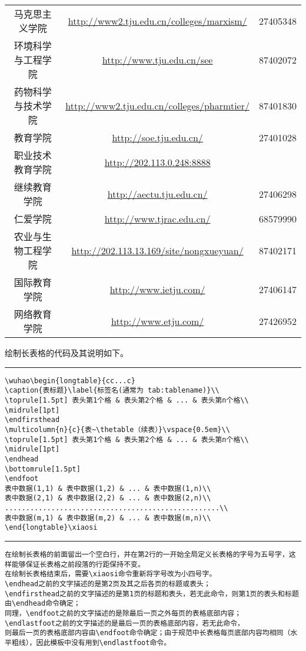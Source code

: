 \begin{longtable}{ccc}
马克思主义学院& \url{http://www2.tju.edu.cn/colleges/marxism/}& 27405348\\
环境科学与工程学院& \url{http://www.tju.edu.cn/see}& 87402072\\
药物科学与技术学院& \url{http://www2.tju.edu.cn/colleges/pharmtier/}& 87401830\\
教育学院& \url{http://soe.tju.edu.cn/}& 27401028\\
职业技术教育学院& \url{http://202.113.0.248:8888}\\
继续教育学院& \url{http://aectu.tju.edu.cn/}& 27406298\\
仁爱学院& \url{http://www.tjrac.edu.cn/}& 68579990\\
农业与生物工程学院& \url{http://202.113.13.169/site/nongxueyuan/}& 87402171\\
国际教育学院 & \url{http://www.ietju.com/}& 27406147\\
网络教育学院 & \url{http://www.etju.com/}& 27426952 \\

\end{longtable}\xiaosi
\vspace{\baselineskip}

绘制长表格的代码及其说明如下。
\vspace{1em}\noindent\hrule

\begin{verbatim}
\wuhao\begin{longtable}{cc...c}
\caption{表标题}\label{标签名(通常为 tab:tablename)}\\
\toprule[1.5pt] 表头第1个格 & 表头第2个格 & ... & 表头第n个格\\ \midrule[1pt]
\endfirsthead
\multicolumn{n}{c}{表~\thetable（续表）}\vspace{0.5em}\\
\toprule[1.5pt] 表头第1个格 & 表头第2个格 & ... & 表头第n个格\\ \midrule[1pt]
\endhead
\bottomrule[1.5pt]
\endfoot
表中数据(1,1) & 表中数据(1,2) & ... & 表中数据(1,n)\\
表中数据(2,1) & 表中数据(2,2) & ... & 表中数据(2,n)\\
...................................................\\
表中数据(m,1) & 表中数据(m,2) & ... & 表中数据(m,n)\\
\end{longtable}\xiaosi
\end{verbatim}

\noindent\hrule
\begin{verbatim}
在绘制长表格的前面留出一个空白行，并在第2行的一开始全局定义长表格的字号为五号字，这样能够保证长表格之前段落的行距保持不变。
在绘制长表格结束后，需要\xiaosi命令重新将字号改为小四号字。
\endhead之前的文字描述的是第2页及其之后各页的标题或表头；
\endfirsthead之前的文字描述的是第1页的标题和表头，若无此命令，则第1页的表头和标题由\endhead命令确定；
同理，\endfoot之前的文字描述的是除最后一页之外每页的表格底部内容；
\endlastfoot之前的文字描述的是最后一页的表格底部内容，若无此命令，
则最后一页的表格底部内容由\endfoot命令确定；由于规范中长表格每页底部内容均相同（水平粗线），因此模板中没有用到\endlastfoot命令。
\end{verbatim}

